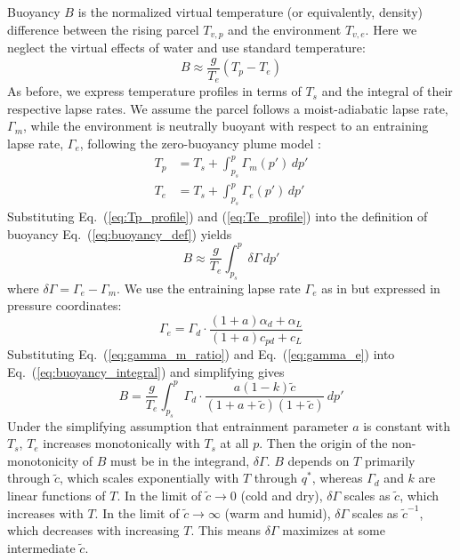 \documentclass[]{ametsocV6.1}
\begin{document}
Buoyancy $B$ is the normalized virtual temperature (or equivalently, density) difference between the rising parcel $T_{v,p}$ and the environment $T_{v,e}$. Here we neglect the virtual effects of water and use standard temperature:
\begin{equation}
B\approx\frac{g}{T_e}(T_p-T_e) \label{eq:buoyancy_def}
\end{equation}
As before, we express temperature profiles in terms of $T_s$ and the integral of their respective lapse rates. We assume the parcel follows a moist-adiabatic lapse rate, $\Gamma_m$, while the environment is neutrally buoyant with respect to an entraining lapse rate, $\Gamma_e$, following the zero-buoyancy plume model \citep{singh2013}:
\begin{align}
T_p&=T_s+\int_{p_s}^p \Gamma_m(p') \, dp' \label{eq:Tp_profile} \\
T_e&=T_s+\int_{p_s}^p \Gamma_e(p') \, dp' \label{eq:Te_profile}
\end{align}
Substituting Eq.~(\ref{eq:Tp_profile}) and (\ref{eq:Te_profile}) into the definition of buoyancy Eq.~(\ref{eq:buoyancy_def}) yields
\begin{equation}
B\approx\frac{g}{T_e}\int_{p_s}^p \delta \Gamma \, dp' \label{eq:buoyancy_integral}
\end{equation}
where $\delta\Gamma = \Gamma_e - \Gamma_m$. We use the entraining lapse rate $\Gamma_e$ as in \cite{romps2016} but expressed in pressure coordinates:
\begin{equation}
\Gamma_e = \Gamma_d \cdot \frac{(1+a)\alpha_d + \alpha_L}{(1+a)c_{pd}+c_L} \label{eq:gamma_e}
\end{equation}
Substituting Eq.~(\ref{eq:gamma_m_ratio}) and Eq.~(\ref{eq:gamma_e}) into Eq.~(\ref{eq:buoyancy_integral}) and simplifying gives
\begin{equation}
    B = \frac{g}{T_e}\int_{p_s}^p \Gamma_d \cdot \frac{a(1-k)\tilde{c}}{(1+a+\tilde{c})(1+\tilde{c})} \, dp' \label{eq:buoyancy_final}
\end{equation}
Under the simplifying assumption that entrainment parameter $a$ is constant with $T_s$, $T_e$ increases monotonically with $T_s$ at all $p$. Then the origin of the non-monotonicity of $B$ must be in the integrand, $\delta \Gamma$. $B$ depends on $T$ primarily through $\tilde{c}$, which scales exponentially with $T$ through $q^*$, whereas $\Gamma_d$ and $k$ are linear functions of $T$. In the limit of $\tilde{c} \to 0$ (cold and dry), $\delta\Gamma$ scales as $\tilde{c}$, which increases with $T$. In the limit of $\tilde{c} \to \infty$ (warm and humid), $\delta\Gamma$ scales as $\tilde{c}^{-1}$, which decreases with increasing $T$. This means $\delta \Gamma$ maximizes at some intermediate $\tilde{c}$.
\end{document}
